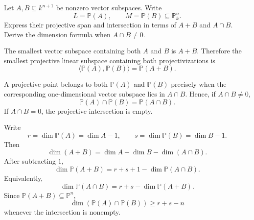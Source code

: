 \begin{problem}\label{prob:vi36-15}
Let \(A,B\subseteq k^{n+1}\) be nonzero vector subspaces. Write
\[
L=\mathbb P(A),\qquad M=\mathbb P(B)\subseteq\mathbb P^n_k.
\]
Express their projective span and intersection in terms of \(A+B\) and \(A\cap B\). Derive the dimension formula
when \(A\cap B\neq0\).

\end{problem}

\ifdefined\FullProblemDossiers
\begin{solution}
The smallest vector subspace containing both \(A\) and \(B\) is \(A+B\). Therefore the smallest projective
linear subspace containing both projectivizations is
\[
\boxed{
\langle\mathbb P(A),\mathbb P(B)\rangle
=
\mathbb P(A+B).
}
\]

A projective point belongs to both \(\mathbb P(A)\) and \(\mathbb P(B)\) precisely when the corresponding
one-dimensional vector subspace lies in \(A\cap B\). Hence, if \(A\cap B\neq0\),
\[
\boxed{
\mathbb P(A)\cap\mathbb P(B)
=
\mathbb P(A\cap B).
}
\]
If \(A\cap B=0\), the projective intersection is empty.

Write
\[
r=\dim\mathbb P(A)=\dim A-1,
\qquad
s=\dim\mathbb P(B)=\dim B-1.
\]
Then
\[
\dim(A+B)
=
\dim A+\dim B-\dim(A\cap B).
\]
After subtracting \(1\),
\[
\dim\mathbb P(A+B)
=
r+s+1-\dim\mathbb P(A\cap B).
\]
Equivalently,
\[
\boxed{
\dim\mathbb P(A\cap B)
=
r+s-\dim\mathbb P(A+B).
}
\]
Since \(\mathbb P(A+B)\subseteq\mathbb P^n\),
\[
\dim(\mathbb P(A)\cap\mathbb P(B))
\ge r+s-n
\]
whenever the intersection is nonempty.
\end{solution}
\fi

